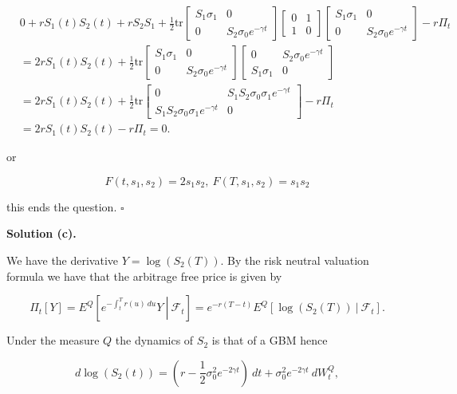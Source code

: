 \documentclass[
]{book}
\begin{document}
\begin{align*}
&0+rS_1(t)S_2(t)+rS_2S_1+\frac{1}{2}\text{tr}
\begin{bmatrix}
S_1\sigma_1 & 0\\
0 & S_2\sigma_0 e^{-\gamma t}
\end{bmatrix}
\begin{bmatrix}
0 & 1\\
1 & 0 
\end{bmatrix}
\begin{bmatrix}
S_1\sigma_1 & 0\\
0 & S_2\sigma_0 e^{-\gamma t}
\end{bmatrix} -r\Pi_t\\
&=2rS_1(t)S_2(t)+\frac{1}{2}\text{tr}
\begin{bmatrix}
S_1\sigma_1 & 0\\
0 & S_2\sigma_0 e^{-\gamma t}
\end{bmatrix}
\begin{bmatrix}
0 & S_2\sigma_0 e^{-\gamma t}\\
S_1\sigma_1 & 0
\end{bmatrix}\\
&=2rS_1(t)S_2(t)+\frac{1}{2}\text{tr}
\begin{bmatrix}
0 & S_1S_2\sigma_0\sigma_1e^{-\gamma t}\\
S_1S_2\sigma_0\sigma_1e^{-\gamma t} & 0
\end{bmatrix}-r\Pi_t\\
&=2rS_1(t)S_2(t)-r\Pi_t=0.
\end{align*}

or

\[
F(t,s_1,s_2)=2s_1s_2,\ F(T,s_1,s_2)=s_1s_2
\]

this ends the question. \(\square\)

\noindent\makebox[\linewidth]{\rule{\textwidth}{0.4pt}}

\textbf{Solution (c).}

We have the derivative \(Y=\log(S_2(T))\). By the risk neutral valuation formula we have that the arbitrage free price is given by

\[
\Pi_t[Y]=E^Q\left[\left.e^{-\int_t^Tr(u)\ du}Y\ \right\vert\ \mathcal{F}_t\right]=e^{-r(T-t)}E^Q\left[\left.\log(S_2(T))\ \right\vert\ \mathcal{F}_t\right].
\]

Under the measure \(Q\) the dynamics of \(S_2\) is that of a GBM hence

\[
d\log(S_2(t))=\left(r-\frac{1}{2}\sigma_0^2e^{-2\gamma t}\right)\ dt+\sigma_0^2e^{-2\gamma t}\ dW^Q_t,
\]
\end{document}
